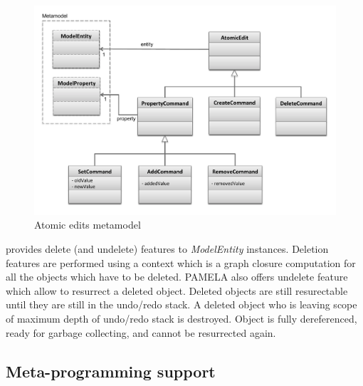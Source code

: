 \begin{figure}
    \centering
    \includegraphics[width=1.0 \columnwidth]{AtomicEditMetaModel.pdf}
    \caption{Atomic edits metamodel}
    \label{fig:AtomicEditMetaModel}
\end{figure}

 provides delete (and undelete) features to \emph{ModelEntity} instances. Deletion features are performed using a context which is a graph closure computation for all the objects which have to be deleted. PAMELA also offers undelete feature which allow to resurrect a deleted object. Deleted objects are still resurectable until they are still in the undo/redo stack. A deleted object who is leaving scope of maximum depth of undo/redo stack is destroyed. Object is fully dereferenced, ready for garbage collecting, and cannot be resurrected again.

\subsection{Meta-programming support}

